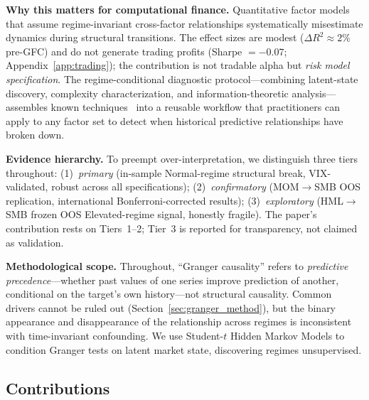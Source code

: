 \documentclass[sigconf,anonymous]{acmart}
\begin{document}
\textbf{Why this matters for computational finance.}
Quantitative factor models that assume regime-invariant cross-factor
relationships systematically misestimate dynamics during structural transitions.
The effect sizes are modest ($\Delta R^2 \approx 2\%$ pre-GFC) and do not
generate trading profits (Sharpe $= -0.07$; Appendix~\ref{app:trading});
the contribution is not tradable alpha but \emph{risk model specification}.
The regime-conditional diagnostic protocol---combining latent-state
discovery, complexity characterization, and information-theoretic
analysis---assembles known techniques~\cite{psaradakis2005markov,tank2022neural,schreiber2000measuring}
into a reusable workflow that practitioners can apply to any factor set
to detect when historical predictive relationships have broken down.

\textbf{Evidence hierarchy.} To preempt over-interpretation, we distinguish
three tiers throughout: (1)~\emph{primary} (in-sample Normal-regime
structural break, VIX-validated, robust across all specifications);
(2)~\emph{confirmatory} (MOM$\to$SMB OOS replication, international
Bonferroni-corrected results); (3)~\emph{exploratory} (HML$\to$SMB
frozen OOS Elevated-regime signal, honestly fragile). The paper's
contribution rests on Tiers~1--2; Tier~3 is reported for
transparency, not claimed as validation.

\textbf{Methodological scope.} Throughout, ``Granger causality'' refers
to \emph{predictive precedence}---whether past values of one series improve prediction
of another, conditional on the target's own history---not structural causality.
Common drivers cannot be ruled out (Section~\ref{sec:granger_method}), but the
binary appearance and disappearance of the relationship across regimes is
inconsistent with time-invariant confounding. We use Student-$t$ Hidden Markov Models to condition
Granger tests on latent market state, discovering regimes unsupervised.

\subsection{Contributions}
\end{document}

